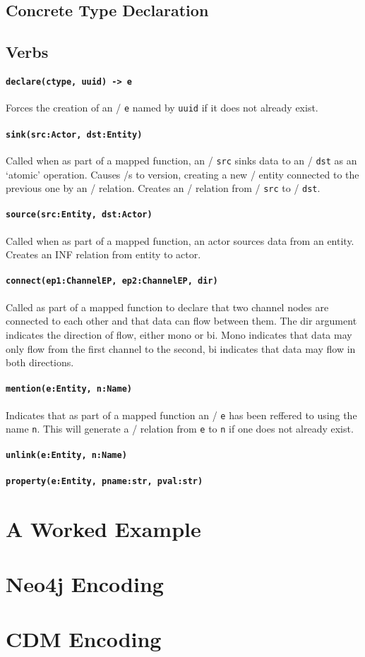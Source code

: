 \documentclass[12pt,twoside,a4paper]{article}
\newcommand{\field}[1]{\texttt{#1}}
\newcommand{\para}[1]{\paragraph{#1\\}}
\begin{document}
\subsection{Concrete Type Declaration}
\label{sec:map:tydef}

\subsection{Verbs}
\label{sec:map:verbs}

\para{\texttt{declare(ctype, uuid) -> e}}
\label{sec:map:verbs:declare}
Forces the creation of an \Entity/ \field{e} named by \field{uuid} if it does not already exist.

\para{\texttt{sink(src:Actor, dst:Entity)}}
\label{sec:map:verbs:sink}
Called when as part of a mapped function, an \Actor/ \field{src} sinks data to an \Entity/ \field{dst} as an ‘atomic’ operation.
Causes \Store/s to version, creating a new \Store/ entity connected to the previous one by an \INF/ relation.
Creates an \INF/ relation from \Actor/ \field{src} to \Entity/ \field{dst}. 

\para{\texttt{source(src:Entity, dst:Actor)}}
\label{sec:map:verbs:source}
Called when as part of a mapped function, an actor sources data from an entity.
Creates an INF relation from entity to actor.

\para{\texttt{connect(ep1:ChannelEP, ep2:ChannelEP, dir)}}
\label{sec:map:verbs:connect}
Called as part of a mapped function to declare that two channel nodes are connected to each other and that data can flow between them. The dir argument indicates the direction of flow, either mono or bi. Mono indicates that data may only flow from the first channel to the second, bi indicates that data may flow in both directions. 

\para{\texttt{mention(e:Entity, n:Name)}}
\label{sec:map:verbs:mention}
Indicates that as part of a mapped function an \Entity/ \field{e} has been reffered to using the name \field{n}. This will generate a \NAMED/ relation from \field{e} to \field{n} if one does not already exist.

\para{\texttt{unlink(e:Entity, n:Name)}}
\label{sec:map:verbs:unlink}

\para{\texttt{property(e:Entity, pname:str, pval:str)}}
\label{sec:map:verbs:property}

\appendix

\section{A Worked Example}
\label{app:example}

\section{Neo4j Encoding}
\label{app:enc:neo4j}

\section{CDM Encoding}
\label{app:enc:cdm}
\end{document}
